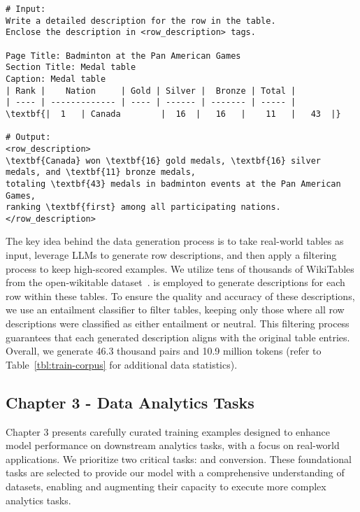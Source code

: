 \begin{tcolorbox}[left=1pt, right=0pt, top=1pt, bottom=1pt]
\begin{Verbatim}
# Input:
Write a detailed description for the row in the table.
Enclose the description in <row_description> tags.

Page Title: Badminton at the Pan American Games
Section Title: Medal table
Caption: Medal table
| Rank |    Nation     | Gold | Silver |  Bronze | Total |
| ---- | ------------- | ---- | ------ | ------- | ----- |
\textbf{|  1   | Canada        |  16  |   16   |    11   |   43  |}

# Output:
<row_description>
\textbf{Canada} won \textbf{16} gold medals, \textbf{16} silver medals, and \textbf{11} bronze medals, 
totaling \textbf{43} medals in badminton events at the Pan American Games,
ranking \textbf{first} among all participating nations.
</row_description>
\end{Verbatim}
\end{tcolorbox}

The key idea behind the data generation process is to take real-world tables as input, leverage LLMs to generate row descriptions, and then apply a filtering process to keep high-scored examples. We utilize tens of thousands of WikiTables from the open-wikitable dataset~\citep{open_wikitable}. \claudetf is employed to generate descriptions for each row within these tables. To ensure the quality and accuracy of these descriptions, we use an entailment classifier to filter tables, keeping only those where all row descriptions were classified as either entailment or neutral. This filtering process guarantees that each generated description aligns with the original table entries. Overall, we generate 46.3 thousand \tabletotext pairs and 10.9 million tokens (refer to Table~\ref{tbl:train-corpus} for additional data statistics).

\subsection{Chapter 3 - Data Analytics Tasks}
\label{sec:chapter3}
Chapter 3 presents carefully curated training examples designed to enhance model performance on downstream analytics tasks, with a focus on real-world applications. We prioritize two critical tasks: \datadiscovery and \texttosql conversion. These foundational tasks are selected to provide our model with a comprehensive understanding of datasets, enabling and augmenting their capacity to execute more complex analytics tasks.

